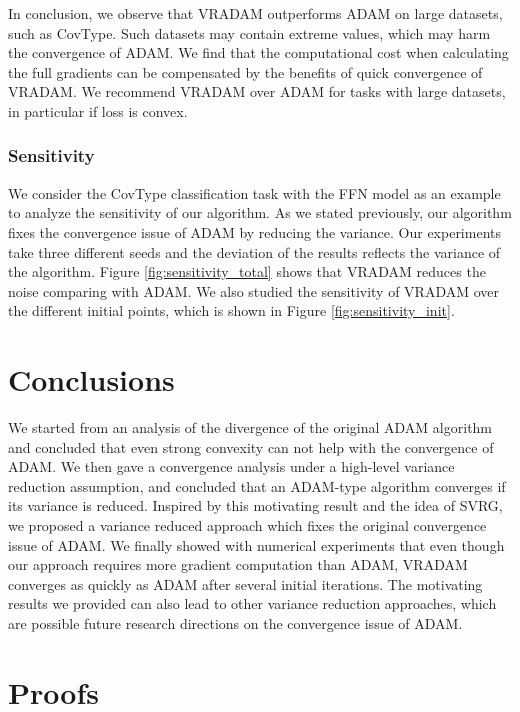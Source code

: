 \documentclass[twoside]{article}
\begin{document}
In conclusion, we observe that VRADAM outperforms ADAM on large datasets, such as CovType. Such datasets may contain extreme values, which may harm the convergence of ADAM. We find that the computational cost when calculating the full gradients can be compensated by the benefits of quick convergence of VRADAM. We recommend VRADAM over ADAM for tasks with large datasets, in particular if loss is convex.

\subsubsection{Sensitivity}
We consider the CovType classification task with the FFN model as an example to analyze the sensitivity of our algorithm. As we stated previously, our algorithm fixes the convergence issue of ADAM by reducing the variance. Our experiments take three different seeds and the deviation of the results reflects the variance of the algorithm.  Figure \ref{fig:sensitivity_total} shows that VRADAM reduces the noise comparing with ADAM. We also studied the sensitivity of VRADAM over the different initial points, which is shown in Figure \ref{fig:sensitivity_init}.

\section{Conclusions}
We started from an analysis of the divergence of the original ADAM algorithm and concluded that even strong convexity can not help with the convergence of ADAM. We then gave a convergence analysis under a high-level variance reduction assumption, and concluded that an ADAM-type algorithm converges if its variance is reduced. Inspired by this motivating result and the idea of SVRG, we proposed a variance reduced approach which fixes the original convergence issue of ADAM. We finally showed with numerical experiments that even though our approach requires more gradient computation than ADAM, VRADAM converges as quickly as ADAM after several initial iterations. The motivating results we provided can also lead to other variance reduction approaches, which are possible future research directions on the convergence issue of ADAM.

% 

\newpage
\appendix
\onecolumn
{}
\section{Proofs}
\end{document}
